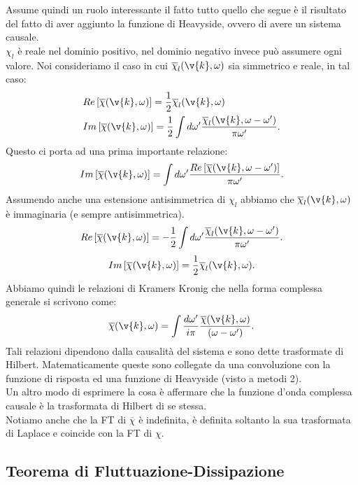 Assume quindi un ruolo interessante il fatto tutto quello che segue è il risultato del fatto di aver aggiunto la funzione di Heavyside, ovvero di avere un sistema causale.\\
$\chi_l$ è reale nel dominio positivo, nel dominio negativo invece può assumere ogni valore. Noi consideriamo il caso in cui $ \overline{\chi}_l(\v{k},\omega)$ sia simmetrico e reale, in tal caso:
\[\begin{aligned}
    &Re\left[ \overline{\chi}(\v{k},\omega)\right] =
    \frac{1}{2}\overline{\chi}_l(\v{k},\omega) \\
    &Im\left[ \overline{\chi}(\v{k},\omega)\right] =
    \frac{1}{2}\int d\omega' 
    \frac{\overline{\chi}_l(\v{k},\omega-\omega')}{\pi\omega'}
.\end{aligned}\]
Questo ci porta ad una prima importante relazione:
\[
    Im\left[\overline{\chi}(\v{k},\omega)\right]=
    \int d\omega' 
    \frac{Re\left[\overline{\chi}(\v{k},\omega-\omega')\right]}{\pi\omega'}
.\] 
Assumendo anche una estensione antisimmetrica di $\chi_l$ abbiamo che $ \overline{\chi}_l(\v{k},\omega)$ è immaginaria (e sempre antisimmetrica).
\[
    Re\left[ \overline{\chi}(\v{k},\omega)\right] =
    -\frac{1}{2}\int d\omega' 
    \frac{\overline{\chi}_l(\v{k},\omega-\omega')}{\pi\omega'}
.\] 
\[
    Im\left[ \overline{\chi}(\v{k},\omega)\right] =
    \frac{1}{2}\overline{\chi}_l(\v{k},\omega) \\
.\] 
Abbiamo quindi le relazioni di Kramers Kronig che nella forma complessa generale si scrivono come:
\[
    \overline{\chi}(\v{k},\omega) = \int \frac{d\omega'}{i\pi}
    \frac{\overline{\chi}(\v{k},\omega)}{(\omega-\omega')}
.\] 
Tali relazioni dipendono dalla causalità del sistema e sono dette trasformate di Hilbert. Matematicamente queste sono collegate da una convoluzione con la funzione di risposta ed una funzione di Heavyside (visto a metodi 2). \\
Un altro modo di esprimere la cosa è affermare che la funzione d'onda complessa causale è la trasformata di Hilbert di se stessa.\\
Notiamo anche che la FT di $ \overline{\chi}$ è indefinita, è definita soltanto la sua trasformata di Laplace e coincide con la FT di $\chi$.\\
\subsection{Teorema di Fluttuazione-Dissipazione}%
\label{sub:Teorema di Fluttuazione-Dissipazione}
